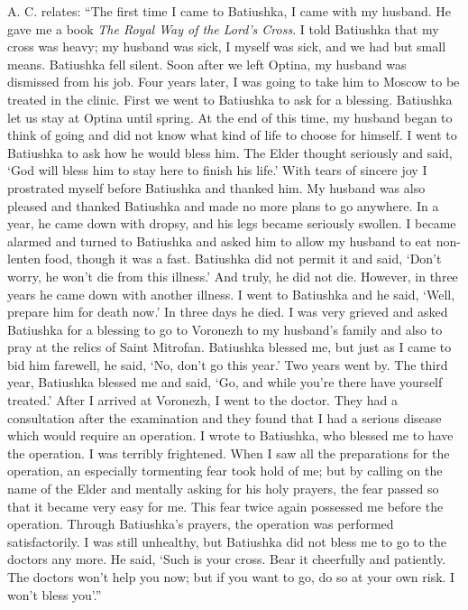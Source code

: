 A. C. relates: ``The first time I came to Batiushka, I came with my husband. He gave me a book \textit{The Royal Way of the Lord's Cross}. I told Batiushka that my cross was heavy; my husband was sick, I myself was sick, and we had but small means. Batiushka fell silent. Soon after we left Optina, my husband was dismissed from his job. Four years later, I was going to take him to Moscow to be treated in the clinic. First we went to Batiushka to ask for a blessing. Batiushka let us stay at Optina until spring. At the end of this time, my husband began to think of going and did not know what kind of life to choose for himself. I went to Batiushka to ask how he would bless him. The Elder thought seriously and said, `God will bless him to stay here to finish his life.' With tears of sincere joy I prostrated myself before Batiushka and thanked him. My husband was also pleased and thanked Batiushka and made no more plans to go anywhere. In a year, he came down with dropsy, and his legs became seriously swollen. I became alarmed and turned to Batiushka and asked him to allow my husband to eat non-lenten food, though it was a fast. Batiushka did not permit it and said, `Don't worry, he won't die from this illness.' And truly, he did not die. However, in three years he came down with another illness. I went to Batiushka and he said, `Well, prepare him for death now.' In three days he died. I was very grieved and asked Batiushka for a blessing to go to Voronezh to my husband's family and also to pray at the relics of Saint Mitrofan. Batiushka blessed me, but just as I came to bid him farewell, he said, `No, don't go this year.' Two years went by. The third year, Batiushka blessed me and said, `Go, and while you're there have yourself treated.' After I arrived at Voronezh, I went to the doctor. They had a consultation after the examination and they found that I had a serious disease which would require an operation. I wrote to Batiushka, who blessed me to have the operation. I was terribly frightened. When I saw all the preparations for the operation, an especially tormenting fear took hold of me; but by calling on the name of the Elder and mentally asking for his holy prayers, the fear passed so that it became very easy for me. This fear twice again possessed me before the operation. Through Batiushka's prayers, the operation was performed satisfactorily. I was still unhealthy, but Batiushka did not bless me to go to the doctors any more. He said, `Such is your cross. Bear it cheerfully and patiently. The doctors won't help you now; but if you want to go, do so at your own risk. I won't bless you'.''


